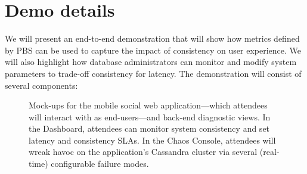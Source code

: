 \section{Demo details}
\label{sec:demo}


We will present an end-to-end demonstration that will show how metrics
defined by PBS can be used to capture the impact of consistency on
user experience. We will also highlight how database administrators
can monitor and modify system parameters to trade-off consistency for
latency. The demonstration will consist of several components:

\begin{figure}[tb]
\centering
\caption{Mock-ups for the mobile social web application---which
  attendees will interact with as end-users---and back-end diagnostic
  views. In the Dashboard, attendees can monitor system consistency
  and set latency and consistency SLAs. In the Chaos Console,
  attendees will wreak havoc on the application's Cassandra cluster
  via several (real-time) configurable failure modes.}
\label{fig:pbs-demo-screenshot}
\end{figure}





